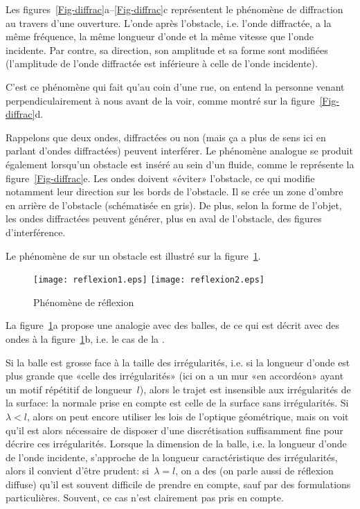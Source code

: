 Les figures~\ref{Fig-diffrac}a--\ref{Fig-diffrac}c représentent le phénomène de diffraction au travers d'une ouverture. L'onde après l'obstacle, i.e. l'onde diffractée, a la même fréquence, la même longueur d'onde et la même vitesse que l'onde incidente. Par contre, sa direction, son amplitude et sa forme sont modifiées (l'amplitude de l'onde diffractée  est inférieure à celle de l'onde incidente). 

C'est ce phénomène qui fait qu'au coin d'une rue, on entend la personne venant perpendiculairement à nous avant de la voir, comme montré sur la figure~\ref{Fig-diffrac}d.

Rappelons que deux ondes, diffractées ou non (mais ça a plus de sens ici en parlant d'ondes diffractées) peuvent interférer.
Le phénomène analogue se produit également lorsqu'un obstacle est inséré au sein d'un fluide, comme le représente la figure~\ref{Fig-diffrac}e. Les ondes doivent «éviter» l'obstacle, ce qui modifie notamment leur direction sur les bords de l'obstacle.
Il se crée un zone d'ombre en arrière de l'obstacle (schématisée en gris).
De plus, selon la forme de l'objet, les ondes diffractées peuvent générer, plus en aval de l'obstacle, des figures d'interférence.

\medskip
Le phénomène de  sur un obstacle est illustré sur la figure~\ref{Fig-reflex}.
\begin{figure}[h!]
\centering
\texttt{[image: reflexion1.eps]}\hspace{2cm}
\texttt{[image: reflexion2.eps]}
\caption{Phénomène de réflexion}\label{Fig-reflex}
\end{figure}
La figure~\ref{Fig-reflex}a propose une analogie avec des balles, de ce qui est décrit avec des ondes à la figure~\ref{Fig-reflex}b, i.e. le cas de la .

Si la balle est grosse face à la taille des irrégularités, i.e. si la longueur d'onde est plus grande que «celle des irrégularités» (ici on a un mur «en accordéon» ayant un motif répétitif de longueur~$l$), alors le trajet est insensible aux irrégularités de la surface: la normale prise en compte est celle de la surface sans irrégularités. Si~$\lambda<l$, alors on peut encore utiliser les lois de l'optique géométrique, mais on voit qu'il est alors nécessaire de disposer d'une discrétisation suffisamment fine pour décrire ces irrégularités. Lorsque la dimension de la balle, i.e. la longueur d'onde de l'onde incidente, s'approche de la longueur caractéristique des irrégularités, alors il convient d'être prudent: si~$\lambda=l$, on a des  (on parle aussi de réflexion diffuse) qu'il est souvent difficile de prendre en compte, sauf par des formulations particulières. Souvent, ce cas n'est clairement pas pris en compte.


